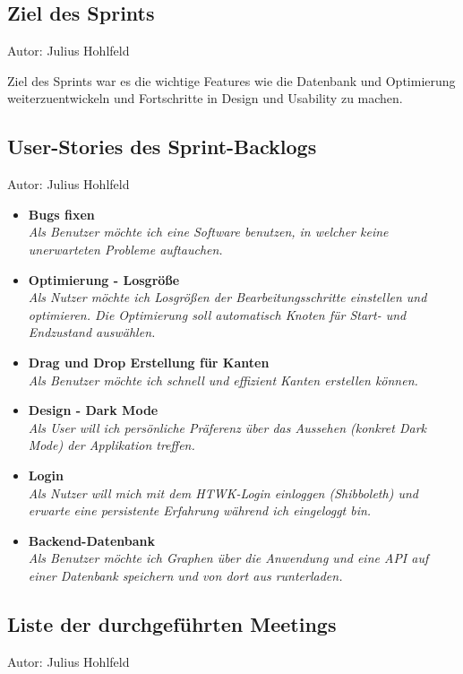 \subsection{Ziel des Sprints}
{\small Autor: Julius Hohlfeld}

Ziel des Sprints war es die wichtige Features wie die Datenbank und Optimierung weiterzuentwickeln und Fortschritte in Design und Usability zu machen.\\

\subsection{User-Stories des Sprint-Backlogs}
{\small Autor: Julius Hohlfeld}

\begin{itemize}
  \item \textbf{Bugs fixen}
        \\\textit{Als Benutzer möchte ich eine Software benutzen, in welcher keine unerwarteten Probleme auftauchen.}
  \item \textbf{ Optimierung - Losgröße }
        \\\textit{
        Als Nutzer möchte ich Losgrößen der Bearbeitungsschritte einstellen und optimieren. Die Optimierung soll automatisch Knoten für Start- und Endzustand auswählen.}
  \item \textbf{Drag und Drop Erstellung für Kanten }
        \\\textit{
          Als Benutzer möchte ich schnell und effizient Kanten erstellen können.}
  \item \textbf{Design - Dark Mode}
        \\\textit{
          Als User will ich persönliche Präferenz über das Aussehen (konkret Dark Mode) der Applikation treffen.}
  \item \textbf{Login}
        \\\textit{
          Als Nutzer will mich mit dem HTWK-Login einloggen (Shibboleth) und erwarte eine persistente Erfahrung während ich eingeloggt bin.}
  \item \textbf{Backend-Datenbank}
        \\\textit{
          Als Benutzer möchte ich Graphen über die Anwendung und eine API auf einer Datenbank speichern und von dort aus runterladen.}
\end{itemize}

\subsection{Liste der durchgeführten Meetings}
{\small Autor: Julius Hohlfeld}

